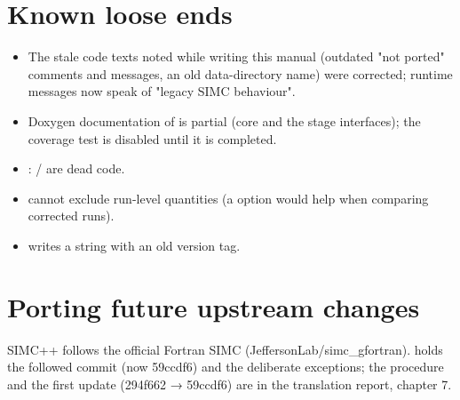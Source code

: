\section{\texorpdfstring{Known loose ends}{Known loose ends}}\label{developer_manual-06u5fstandards:64-known-loose-ends}
\begin{itemize}
\item The stale code texts noted while writing this manual (outdated "not ported" comments and messages, an old data-directory
name) were corrected; runtime messages now speak of "legacy SIMC behaviour".
\item Doxygen documentation of  is partial (core and the stage interfaces); the coverage test 
is disabled until it is completed.
\item {}:  /  are dead code.
\item {} cannot exclude run-level quantities (a  option would help when comparing corrected runs).
\item {} writes a  string with an old version tag.
\end{itemize}
\section{\texorpdfstring{Porting future upstream changes}{Porting future upstream changes}}\label{developer_manual-06u5fstandards:65-porting-future-upstream-changes}
SIMC++ follows the official Fortran SIMC (JeffersonLab/\allowbreak{}simc\_\allowbreak{}gfortran).  holds the followed commit (now
59ccdf6) and the deliberate exceptions; the procedure and the first update (294f662 → 59ccdf6) are in the translation
report, chapter 7.

